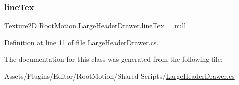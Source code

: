 \subsubsection{\texorpdfstring{line\+Tex}{lineTex}}
{\footnotesize\ttfamily Texture2D Root\+Motion.\+Large\+Header\+Drawer.\+line\+Tex = null\hspace{0.3cm}{\ttfamily [static]}}



Definition at line 11 of file Large\+Header\+Drawer.\+cs.



The documentation for this class was generated from the following file\+:\begin{DoxyCompactItemize}
\item 
Assets/\+Plugins/\+Editor/\+Root\+Motion/\+Shared Scripts/\mbox{\hyperlink{_large_header_drawer_8cs}{Large\+Header\+Drawer.\+cs}}\end{DoxyCompactItemize}
